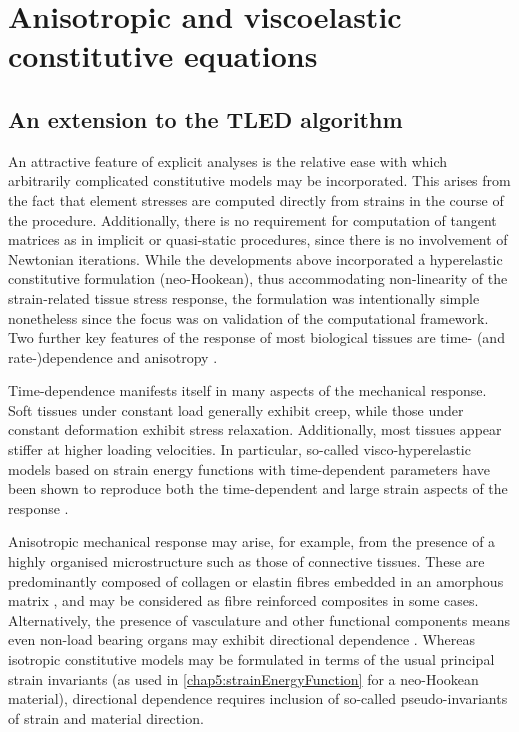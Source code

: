 \section{Anisotropic and viscoelastic constitutive equations}

	\subsection{An extension to the TLED algorithm}	
An attractive feature of explicit analyses is the relative ease with which arbitrarily complicated constitutive models may be incorporated. This arises from the fact that element stresses are computed directly from strains in the course of the procedure. Additionally, there is no requirement for computation of tangent matrices as in implicit or quasi-static procedures, since there is no involvement of Newtonian iterations. While the developments above incorporated a hyperelastic constitutive formulation (neo-Hookean), thus accommodating non-linearity of the strain-related tissue stress response, the formulation was intentionally simple nonetheless since the focus was on validation of the computational framework. Two further key features of the response of most biological tissues are time- (and rate-)dependence and anisotropy \citep{Fung93}. 

Time-dependence manifests itself in many aspects of the mechanical response. Soft tissues under constant load generally exhibit creep, while those under constant deformation exhibit stress relaxation. Additionally, most tissues appear stiffer at higher loading velocities. In particular, so-called visco-hyperelastic models based on strain energy functions with time-dependent parameters have been shown to reproduce both the time-dependent and large strain aspects of the response \citep{Miller97,Miller00,Nava08}. 

Anisotropic mechanical response may arise, for example, from the presence of a highly organised microstructure such as those of connective tissues. These are predominantly composed of collagen or elastin fibres embedded in an amorphous matrix \citep{Fung93}, and may be considered as fibre reinforced composites in some cases. Alternatively, the presence of vasculature and other functional components means even non-load bearing organs may exhibit directional dependence \citep{Picinbono01,Prange02}. Whereas isotropic constitutive models may be formulated in terms of the usual principal strain invariants (as used in \eqref{chap5:strainEnergyFunction} for a neo-Hookean material), directional dependence requires inclusion of so-called pseudo-invariants of strain and material direction. 

